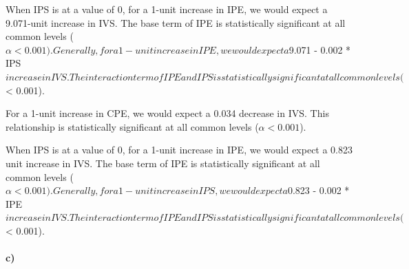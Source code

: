 \documentclass[12pt]{article}\usepackage[]{graphicx}\usepackage[]{color}
\begin{document}
When IPS is at a value of 0, for a 1-unit increase in IPE, we would expect a 9.071-unit increase in IVS. The base term of IPE is statistically significant at all common levels ($\alpha < 0.001).

Generally, for a 1-unit increase in IPE, we would expect a $9.071 - 0.002 * IPS$ increase in IVS. The interaction term of IPE and IPS is statistically significant at all common levels ($\alpha < 0.001).

For a 1-unit increase in CPE, we would expect a 0.034 decrease in IVS. This relationship is statistically significant at all common levels ($\alpha < 0.001$).

When IPS is at a value of 0, for a 1-unit increase in IPE, we would expect a 0.823 unit increase in IVS. The base term of IPE is statistically significant at all common levels ($\alpha < 0.001).

Generally, for a 1-unit increase in IPS, we would expect a $0.823 - 0.002 * IPE$ increase in IVS. The interaction term of IPE and IPS is statistically significant at all common levels ($\alpha < 0.001).



\paragraph{c)}
\end{document}
